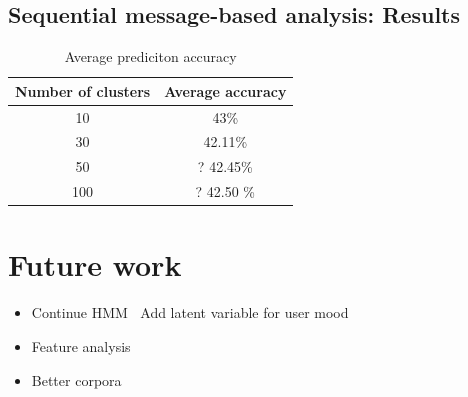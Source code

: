 \documentclass[
paper=128mm:96mm, %
fontsize=11pt, %
pagesize, %
parskip=half-, %
]{scrartcl} %
\newcommand{\red}[1]{\textit{\color{red}{#1}}}
\theoremstyle{mythmstyle} %
\begin{document}

\clearpage


\subsection*{Sequential message-based analysis: Results}

\begin{table}[h]
\centering
\begin{tabular}{c c}
\toprule
\textbf{Number of clusters} & \textbf{Average accuracy} \\
\midrule
10 & 43\% \\
30 & 42.11\%\\
50 & ? 42.45\%\\
100 & ? 42.50 \%\\
\bottomrule
\end{tabular}
\caption{Average prediciton accuracy}
\end{table}


\clearpage


\section*{Future work}
\begin{itemize}
\item Continue HMM
\subitem \textbullet $\:$ Add latent variable for user mood
\item Feature analysis
\item Better corpora
\end{itemize}

\end{document}
